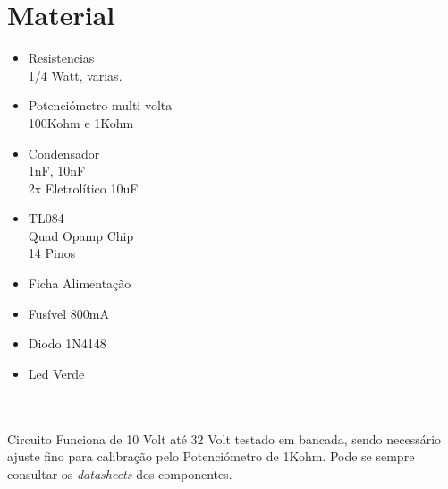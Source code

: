 \documentclass[titlepage, a4paper, 10pt, reqno, openany]{report}
\begin{document}
\section{Material}
\begin{minipage}[t]{.4\linewidth}
	\begin{itemize}
		\setlength\itemsep{-0.5em}
		\item Resistencias \\
		1/4 Watt, varias.
		\item Potenciómetro multi-volta \\
		100Kohm e 1Kohm
		\item Condensador \\
		1nF, 10nF  \\
		2x Eletrolítico 10uF
		
	\end{itemize}
\end{minipage}
\begin{minipage}[t]{.31\linewidth}
	\begin{itemize}
		\setlength\itemsep{-0.5em}
		\item TL084 \\
		Quad Opamp Chip \\
		14 Pinos
		\item Ficha Alimentação
		\item Fusível 800mA
		\item Diodo 1N4148
		\item Led Verde \\
	\end{itemize}
\end{minipage}\\
\\
Circuito Funciona de 10 Volt até 32 Volt testado em bancada, sendo necessário ajuste fino para calibração pelo Potenciómetro de  1Kohm.
Pode se sempre consultar os {\it datasheets} dos componentes.
\end{document}
